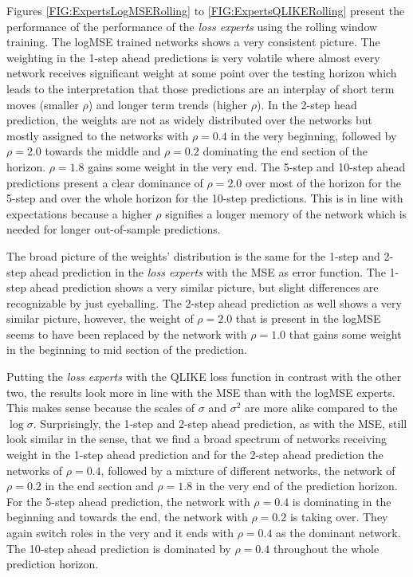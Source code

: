 Figures \ref{FIG:ExpertsLogMSERolling} to \ref{FIG:ExpertsQLIKERolling} present the performance of the performance of the \textit{loss experts} using the rolling window training. The logMSE trained networks shows a very consistent picture. The weighting in the 1-step ahead predictions is very volatile where almost every network receives significant weight at some point over the testing horizon which leads to the interpretation that those predictions are an interplay of short term moves (smaller $\rho$) and longer term trends (higher $\rho$). In the 2-step head prediction, the weights are not as widely distributed over the networks but mostly assigned to the networks with $\rho = 0.4$ in the very beginning, followed by $\rho = 2.0$ towards the middle and $\rho = 0.2$ dominating the end section of the horizon. $\rho = 1.8$ gains some weight in the very end. The 5-step and 10-step ahead predictions present a clear dominance of $\rho = 2.0$ over most of the horizon for the 5-step and over the whole horizon for the 10-step predictions. This is in line with expectations because a higher $\rho$ signifies a longer memory of the network which is needed for longer out-of-sample predictions.

The broad picture of the weights' distribution is the same for the 1-step and 2-step ahead prediction in the \textit{loss experts} with the MSE as error function. The 1-step ahead prediction shows a very similar picture, but slight differences are recognizable by just eyeballing. The 2-step ahead prediction as well shows a very similar picture, however, the weight of $\rho = 2.0$ that is present in the logMSE seems to have been replaced by the network with $\rho = 1.0$ that gains some weight in the beginning to mid section of the prediction.

Putting the \textit{loss experts} with the QLIKE loss function in contrast with the other two, the results look more in line with the MSE than with the logMSE experts. This makes sense because the scales of $\sigma$ and $\sigma^2$ are more alike compared to the $\log{\sigma}$. Surprisingly, the 1-step and 2-step ahead prediction, as with the MSE, still look similar in the sense, that we find a broad spectrum of networks receiving weight in the 1-step ahead prediction and for the 2-step ahead prediction the networks of $\rho = 0.4$, followed by a mixture of different networks, the network of $\rho = 0.2$ in the end section and $\rho = 1.8$ in the very end of the prediction horizon.
For the 5-step ahead prediction, the network with $\rho = 0.4$ is dominating in the beginning and towards the end, the network with $\rho = 0.2$ is taking over. They again switch roles in the very and it ends with $\rho = 0.4$ as the dominant network. The 10-step ahead prediction is dominated by $\rho = 0.4$ throughout the whole prediction horizon.

